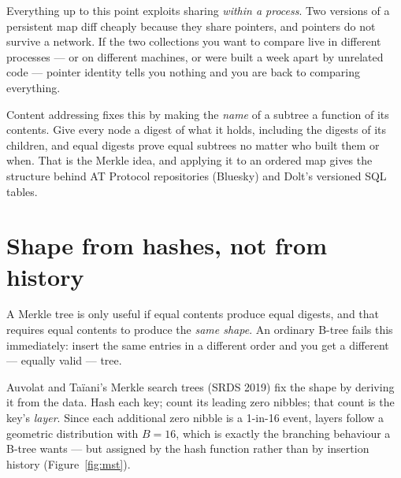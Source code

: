 \documentclass[11pt,twoside,openright]{book}
\newcommand{\term}[1]{\textit{#1}}
\begin{document}
\noindent
Everything up to this point exploits sharing \emph{within a process}. Two
versions of a persistent map diff cheaply because they share pointers, and
pointers do not survive a network. If the two collections you want to compare
live in different processes --- or on different machines, or were built a week
apart by unrelated code --- pointer identity tells you nothing and you are back
to comparing everything.

Content addressing fixes this by making the \emph{name} of a subtree a function
of its contents. Give every node a digest of what it holds, including the digests
of its children, and equal digests prove equal subtrees no matter who built them
or when. That is the Merkle idea, and applying it to an ordered map gives
the structure behind AT Protocol repositories (Bluesky) and Dolt's versioned SQL
tables.

\section{Shape from hashes, not from history}

A Merkle tree is only useful if equal contents produce equal digests, and that
requires equal contents to produce the \emph{same shape}. An ordinary B-tree
fails this immediately: insert the same entries in a different order and you get
a different --- equally valid --- tree.

Auvolat and Taïani's Merkle search trees (SRDS 2019) fix the shape by deriving
it from the data. Hash each key; count its leading zero nibbles; that count is
the key's \term{layer}. Since each additional zero nibble is a 1-in-16 event,
layers follow a geometric distribution with $B = 16$, which is exactly the
branching behaviour a B-tree wants --- but assigned by the hash function rather
than by insertion history (Figure~\ref{fig:mst}).
\end{document}
